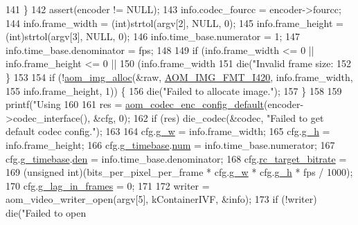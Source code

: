 \begin{DoxyCodeInclude}
{141   \}
142   assert(encoder != NULL);
143   info.codec\_fourcc = encoder->fourcc;
144   info.frame\_width = (int)strtol(argv[2], NULL, 0);
145   info.frame\_height = (int)strtol(argv[3], NULL, 0);
146   info.time\_base.numerator = 1;
147   info.time\_base.denominator = fps;
148 
149   \textcolor{keywordflow}{if} (info.frame\_width <= 0 || info.frame\_height <= 0 ||
150       (info.frame\_width %
151     die(\textcolor{stringliteral}{"Invalid frame size: %
152   \}
153 
154   \textcolor{keywordflow}{if} (!\hyperlink{aom__image_8h_a570db29fbd122951235a08fe9375f6bb}{aom\_img\_alloc}(&raw, \hyperlink{aom__image_8h_a930317c04b4bd0a660bb5e744055523cabd778a3d697463e89d12a1117f417b60}{AOM\_IMG\_FMT\_I420}, info.frame\_width,
155                      info.frame\_height, 1)) \{
156     die(\textcolor{stringliteral}{"Failed to allocate image."});
157   \}
158 
159   printf(\textcolor{stringliteral}{"Using %
160 
161   res = \hyperlink{group__encoder_gabe456ab6f99bdebc47018779b75d2521}{aom\_codec\_enc\_config\_default}(encoder->codec\_interface(), &cfg, 0);
162   \textcolor{keywordflow}{if} (res) die\_codec(&codec, \textcolor{stringliteral}{"Failed to get default codec config."});
163 
164   cfg.\hyperlink{structaom__codec__enc__cfg_a80cb459c5ef3c7e1516f617c4c9d6eab}{g\_w} = info.frame\_width;
165   cfg.\hyperlink{structaom__codec__enc__cfg_a37b0f57b63bec8d133df8901d4407ee6}{g\_h} = info.frame\_height;
166   cfg.\hyperlink{structaom__codec__enc__cfg_a10664f1fc5b6ec29b77ee13efeeecdf7}{g\_timebase}.\hyperlink{structaom__rational_a7b48174411798c780a15f132c4650839}{num} = info.time\_base.numerator;
167   cfg.\hyperlink{structaom__codec__enc__cfg_a10664f1fc5b6ec29b77ee13efeeecdf7}{g\_timebase}.\hyperlink{structaom__rational_adeddf2ea01c12b7be66536e0a0fb92c5}{den} = info.time\_base.denominator;
168   cfg.\hyperlink{structaom__codec__enc__cfg_ab21539da477dba7506d90353c27d218b}{rc\_target\_bitrate} =
169       (\textcolor{keywordtype}{unsigned} int)(bits\_per\_pixel\_per\_frame * cfg.\hyperlink{structaom__codec__enc__cfg_a80cb459c5ef3c7e1516f617c4c9d6eab}{g\_w} * cfg.\hyperlink{structaom__codec__enc__cfg_a37b0f57b63bec8d133df8901d4407ee6}{g\_h} * fps / 1000);
170   cfg.\hyperlink{structaom__codec__enc__cfg_a614a49318f2011cc8735d7e51b910fa4}{g\_lag\_in\_frames} = 0;
171 
172   writer = aom\_video\_writer\_open(argv[5], kContainerIVF, &info);
173   \textcolor{keywordflow}{if} (!writer) die(\textcolor{stringliteral}{"Failed to open %
}}}}
\end{DoxyCodeInclude}
